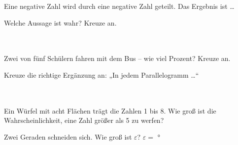\documentclass[11pt]{article}
\begin{document}
\begin{aufgabe}{Eine negative Zahl wird durch eine negative Zahl geteilt. Das Ergebnis ist … \\   }
\end{aufgabe}

\begin{aufgabe}{Welche Aussage ist wahr? Kreuze an.\\ \\ \\ }
\end{aufgabe}

\begin{aufgabe}{Zwei von fünf Schülern fahren mit dem Bus – wie viel Prozent? Kreuze an. \\    }
\end{aufgabe}

\begin{aufgabe}{Kreuze die richtige Ergänzung an: „In jedem Parallelogramm …“\\ \\ \\ }
\end{aufgabe}

\begin{aufgabe}{Ein Würfel mit acht Flächen trägt die Zahlen 1 bis 8. Wie groß ist die Wahrscheinlichkeit, eine Zahl größer als 5 zu werfen? \leerfeld}
\end{aufgabe}

\begin{aufgabe}{\begin{minipage}[t]{0.6\linewidth}Zwei Geraden schneiden sich. Wie groß ist $\varepsilon$? $\varepsilon =$ \leerfeld °\end{minipage}\hfill\begin{minipage}[t]{0.37\linewidth}\vspace{0pt}
\end{minipage}}
\end{aufgabe}
\end{document}
